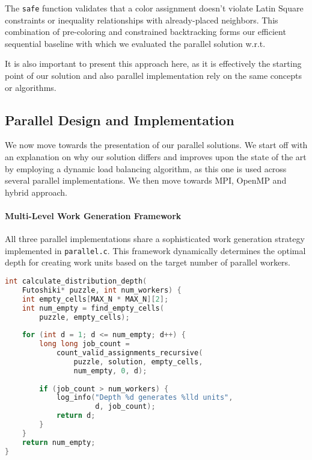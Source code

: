 The \texttt{safe} function validates that a color assignment doesn't violate Latin Square constraints or inequality relationships with already-placed neighbors. This combination of pre-coloring and constrained backtracking forms our efficient sequential baseline with which we evaluated the parallel solution w.r.t.

It is also important to present this approach here, as it is effectively the starting point of our solution and also parallel implementation rely on the same concepts or algorithms.

\subsection{Parallel Design and Implementation}
\label{subsec:parallel_implementation}
We now move towards the presentation of our parallel solutions. We start off with an explanation on why our solution differs and improves upon the state of the art by employing a dynamic load balancing algorithm, as this one is used across several parallel implementations. We then move towards MPI, OpenMP and hybrid approach.  

\paragraph{Multi-Level Work Generation Framework}
\label{par:dynamic_load_balancing}
All three parallel implementations share a sophisticated work generation strategy implemented in \texttt{parallel.c}. This framework dynamically determines the optimal depth for creating work units based on the target number of parallel workers.

\begin{lstlisting}[language=C, caption=Dynamic depth calculation]
int calculate_distribution_depth(
    Futoshiki* puzzle, int num_workers) {
    int empty_cells[MAX_N * MAX_N][2];
    int num_empty = find_empty_cells(
        puzzle, empty_cells);
    
    for (int d = 1; d <= num_empty; d++) {
        long long job_count = 
            count_valid_assignments_recursive(
                puzzle, solution, empty_cells, 
                num_empty, 0, d);
        
        if (job_count > num_workers) {
            log_info("Depth %d generates %lld units", 
                     d, job_count);
            return d;
        }
    }
    return num_empty;
}
\end{lstlisting}

